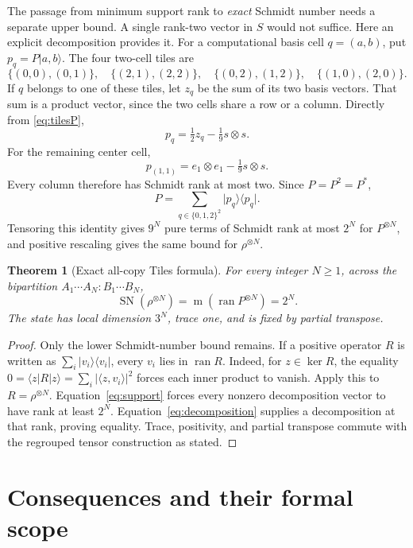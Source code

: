 \documentclass[11pt]{article}
\newtheorem{theorem}{Theorem}[section]
\theoremstyle{definition}
\newcommand{\SN}{\operatorname{SN}}
\newcommand{\ran}{\operatorname{ran}}
\newcommand{\minrank}{\operatorname{m}}
\newcommand{\ket}[1]{\lvert #1\rangle}
\newcommand{\bra}[1]{\langle #1\rvert}
\newcommand{\pure}[1]{\ket{#1}\!\bra{#1}}
\begin{document}
The passage from minimum support rank to \emph{exact} Schmidt number needs a
separate upper bound. A single rank-two vector in $S$ would not suffice.
Here an explicit decomposition provides it. For a computational basis cell
$q=(a,b)$, put $p_q=P\ket{a,b}$. The four two-cell tiles are
\[
 \{(0,0),(0,1)\},\quad \{(2,1),(2,2)\},\quad
 \{(0,2),(1,2)\},\quad \{(1,0),(2,0)\}.
\]
If $q$ belongs to one of these tiles, let $z_q$ be the sum of its two basis
vectors. That sum is a product vector, since the two cells share a row or a
column. Directly from \eqref{eq:tilesP},
\[
 p_q=\tfrac12z_q-\tfrac19s\otimes s.
\]
For the remaining center cell,
\[
 p_{(1,1)}=e_1\otimes e_1-\tfrac19s\otimes s.
\]
Every column therefore has Schmidt rank at most two. Since $P=P^2=P^*$,
\begin{equation}\label{eq:decomposition}
 P=\sum_{q\in\{0,1,2\}^2}\pure{p_q}.
\end{equation}
Tensoring this identity gives $9^N$ pure terms of Schmidt rank at most $2^N$
for $P^{\otimes N}$, and positive rescaling gives the same bound for
$\rho^{\otimes N}$.

\begin{theorem}[Exact all-copy Tiles formula]\label{thm:tiles}
For every integer $N\ge1$, across the bipartition
$A_1\cdots A_N:B_1\cdots B_N$,
\begin{equation}\label{eq:exact}
 \boxed{\quad\SN(\rho^{\otimes N})
 =\minrank(\ran P^{\otimes N})=2^N.\quad}
\end{equation}
The state has local dimension $3^N$, trace one, and is fixed by partial
transpose.
\end{theorem}

\begin{proof}
Only the lower Schmidt-number bound remains. If a positive operator $R$ is
written as $\sum_i\pure{v_i}$, every $v_i$ lies in $\ran R$. Indeed, for
$z\in\ker R$, the equality $0=\bra zR\ket z=\sum_i|\langle z,v_i\rangle|^2$
forces each inner product to vanish. Apply this to $R=\rho^{\otimes N}$.
Equation~\eqref{eq:support} forces every nonzero decomposition vector to
have rank at least $2^N$. Equation~\eqref{eq:decomposition} supplies a
decomposition at that rank, proving equality. Trace, positivity, and partial
transpose commute with the regrouped tensor construction as stated.
\end{proof}

\section{Consequences and their formal scope}
\end{document}
